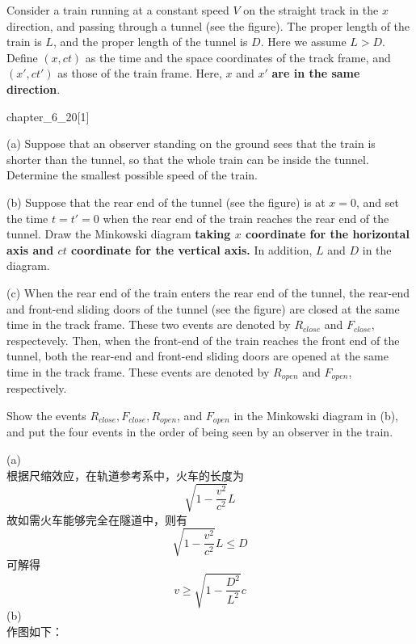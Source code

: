 \begin{solution}
	Consider a train running at a constant speed $V$ on the straight track in the $x$ direction, and passing through a tunnel (see the figure). The proper length of the train is $L$, and the proper length of the tunnel is $D$. Here we assume $L>D$. Define $(x,ct)$ as the time and the space coordinates of the track frame, and $(x',ct')$ as those of the train frame. Here, $x$ and $x' $\textbf{ are in the same direction}.
	\begin{singlefigure}{chapter_6_20}[1]    
	\end{singlefigure}
	(a) Suppose that an observer standing on the ground sees that the train is shorter than the tunnel, so that the whole train can be inside the tunnel. Determine the smallest possible speed of the train.
	
	(b) Suppose that the rear end of the tunnel (see the figure) is at $x=0$, and set the time $t=t'=0$ when the rear end of the train reaches the rear end of the tunnel. Draw the Minkowski diagram \textbf{ taking $x$ coordinate for the horizontal axis and $ct$ coordinate for the vertical axis.} In addition,  $L$ and $D$ in the diagram.
	
	(c) When the rear end of the train enters the rear end of the tunnel, the rear-end and front-end sliding doors of the tunnel (see the figure) are closed at the same time in the track frame. These two events are denoted by $R_{close}$ and $F_{close}$, respectevely. Then, when the front-end of the train reaches the front end of the tunnel, both the rear-end and front-end sliding doors are opened at the same time in the track frame. These events are denoted by $R_{open}$ and $F_{open}$, respectively.
	
	Show the events $R_{close},F_{close},R_{open}$, and $F_{open}$ in the Minkowski diagram in (b),
	and put the four events in the order of being seen by an observer in the train.
	
	\tcbrule
	
    (a)
    \\根据尺缩效应，在轨道参考系中，火车的长度为
    \[\sqrt{1-\dfrac{v^2}{c^2}}L\]
    故如需火车能够完全在隧道中，则有
    \[\sqrt{1-\dfrac{v^2}{c^2}}L\le D\]
    可解得
    \[v\ge \sqrt{1-\dfrac{D^2}{L^2}}c\]
    (b)\\
    作图如下：
    \begin{center}
    \end{center}
    

\end{solution}
